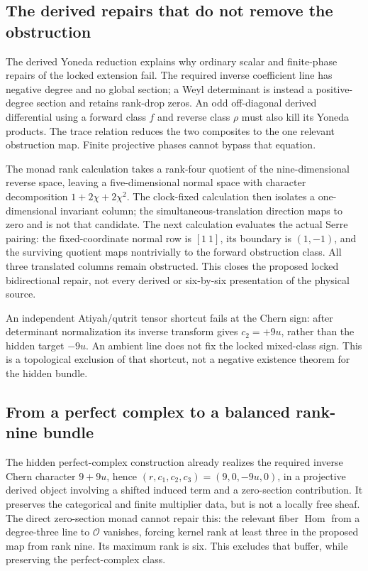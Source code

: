 \documentclass[11pt]{article}
\theoremstyle{definition}
\theoremstyle{remark}
\begin{document}
\subsection{The derived repairs that do not remove the obstruction}
\label{sec:yoneda}

The derived Yoneda reduction \cite{FRG3K} explains why ordinary scalar and
finite-phase repairs of the locked extension fail.  The required inverse
coefficient line has negative degree and no global section; a Weyl
determinant is instead a positive-degree section and retains rank-drop
zeros.  An odd off-diagonal derived differential using a forward class
\(f\) and reverse class \(\rho\) must also kill its Yoneda products.
The trace relation reduces the two composites to the one relevant
obstruction map.  Finite projective phases cannot bypass that equation.

The monad rank calculation \cite{FRG3L} takes a rank-four quotient of the
nine-dimensional reverse space, leaving a five-dimensional normal space
with character decomposition \(1+2\chi+2\chi^2\).  The clock-fixed
calculation \cite{FRG3M} then isolates a one-dimensional invariant column;
the simultaneous-translation direction maps to zero and is not that
candidate.  The next calculation \cite{FRG3N} evaluates the actual Serre
pairing: the fixed-coordinate normal row is \([1\ 1]\), its boundary is
\((1,-1)\), and the surviving quotient maps nontrivially to the forward
obstruction class.  All three translated columns remain obstructed.  This
closes the proposed locked bidirectional repair, not every derived or
six-by-six presentation of the physical source.

An independent Atiyah/qutrit tensor shortcut \cite{FRG3O} fails at the Chern
sign: after determinant normalization its inverse transform gives
\(c_2=+9u\), rather than the hidden target \(-9u\).  An ambient line does
not fix the locked mixed-class sign.  This is a topological exclusion of
that shortcut, not a negative existence theorem for the hidden bundle.

\subsection{From a perfect complex to a balanced rank-nine bundle}
\label{sec:hidden-object}

The hidden perfect-complex construction \cite{FRG3P} already realizes the
required inverse Chern character \(9+9u\), hence
\((r,c_1,c_2,c_3)=(9,0,-9u,0)\), in a projective derived object involving
a shifted induced term and a zero-section contribution.  It preserves the
categorical and finite multiplier data, but is not a locally free sheaf.
The direct zero-section monad \cite{FRG3Q} cannot repair this: the relevant
fiber \(\operatorname{Hom}\) from a degree-three line to \(\mathcal O\)
vanishes, forcing kernel rank at least three in the proposed map from rank
nine.  Its maximum rank is six.  This excludes that buffer, while preserving
the perfect-complex class.
\end{document}
